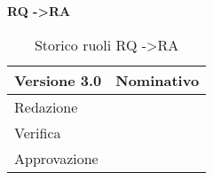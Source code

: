 \textbf{RQ -\textgreater RA}

\begin{table}[h]
\begin{center}

\begin{tabular}{p{} p{}}
\toprule
\textbf{Versione 3.0}	&	\textbf{Nominativo}\\
\midrule
\midrule
Redazione	&	\VP \\
\midrule
Verifica &	\SL	\\
\midrule
Approvazione	&	\MB	\\
\bottomrule
\end{tabular}
\caption{Storico ruoli RQ -\textgreater RA}
\label{tabVers3}
\end{center}
\end{table}